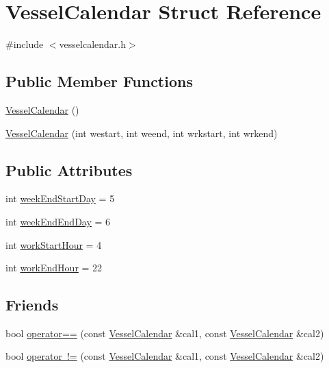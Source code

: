 \hypertarget{struct_vessel_calendar}{}\section{Vessel\+Calendar Struct Reference}
\label{struct_vessel_calendar}


{\ttfamily \#include $<$vesselcalendar.\+h$>$}

\subsection*{Public Member Functions}
\begin{DoxyCompactItemize}
\item 
\mbox{\hyperlink{struct_vessel_calendar_a1376545e5ea9248b88afc248479bcab4}{Vessel\+Calendar}} ()
\item 
\mbox{\hyperlink{struct_vessel_calendar_a3d7c2219b6b6a549799c55f9914565f6}{Vessel\+Calendar}} (int westart, int weend, int wrkstart, int wrkend)
\end{DoxyCompactItemize}
\subsection*{Public Attributes}
\begin{DoxyCompactItemize}
\item 
int \mbox{\hyperlink{struct_vessel_calendar_acde56a94cbb199b8b13590f4277256c0}{week\+End\+Start\+Day}} = 5
\item 
int \mbox{\hyperlink{struct_vessel_calendar_a0d1a1fd59839aa594810b03b6cd8942b}{week\+End\+End\+Day}} = 6
\item 
int \mbox{\hyperlink{struct_vessel_calendar_a54c064aac908013f15889226ec8b5d50}{work\+Start\+Hour}} = 4
\item 
int \mbox{\hyperlink{struct_vessel_calendar_adcd498046edb0a7283604f2af13c091f}{work\+End\+Hour}} = 22
\end{DoxyCompactItemize}
\subsection*{Friends}
\begin{DoxyCompactItemize}
\item 
bool \mbox{\hyperlink{struct_vessel_calendar_a3e5b4ef27567f66ecc6b0414afd4a084}{operator==}} (const \mbox{\hyperlink{struct_vessel_calendar}{Vessel\+Calendar}} \&cal1, const \mbox{\hyperlink{struct_vessel_calendar}{Vessel\+Calendar}} \&cal2)
\item 
bool \mbox{\hyperlink{struct_vessel_calendar_a35934f814c5fa525c3051f04083fed28}{operator !=}} (const \mbox{\hyperlink{struct_vessel_calendar}{Vessel\+Calendar}} \&cal1, const \mbox{\hyperlink{struct_vessel_calendar}{Vessel\+Calendar}} \&cal2)
\end{DoxyCompactItemize}


